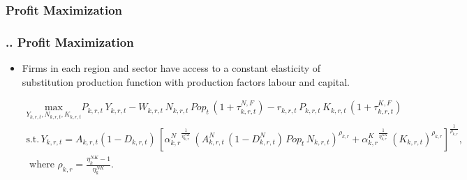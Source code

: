 \documentclass[11pt,aspectratio=169]{beamer}
\begin{document}
\subsubsection{Profit Maximization}
\begin{frame}
\frametitle{{\thesection.\thesubsection.\thesubsubsection} Profit Maximization}
\scriptsize
\begin{itemize}
\item Firms in each region and sector have access to a constant elasticity of substitution production function with production factors labour and capital.

\begin{align*}
\underset{Y_{k,r,t}, N_{k,r,t}, K_{k,r,t}}{\mathrm{max}} P_{k,r,t} \, Y_{k,r,t} - W_{k,r,t} \, N_{k,r,t} \, Pop_{t} \, (1 + \tau^{N,F}_{k,r,t}) - r_{k,r,t} \, P_{k,r,t} \, K_{k,r,t} \, (1 + \tau^{K,F}_{k,r,t})\nonumber \\ 
\mbox{s.t.} \, Y_{k,r,t} = A_{k,r,t} (1 - D_{k,r,t}) \, \left[{\alpha^{N}_{k,r}}^{\frac{1}{\eta^{NK}_{k,r}}} \, \left( A^{N}_{k,r,t} \, (1 - D^{N}_{k,r,t}) \, Pop_{t} \, N_{k,r,t}\right)^{\rho_{k,r}} + {\alpha^{K}_{k,r}}^{\frac{1}{\eta^{NK}_{k,r}}} \, \left(K_{k,r,t}\right)^{\rho_{k,r}}\right]^{\frac{1}{\rho_{k,r}}}, \nonumber \\
\mbox{ where } \rho_{k,r} = \frac{\eta^{NK}_{k} - 1}{\eta^{NK}_{k}}.
\end{align*}
\end{itemize}
\end{frame}
\end{document}
